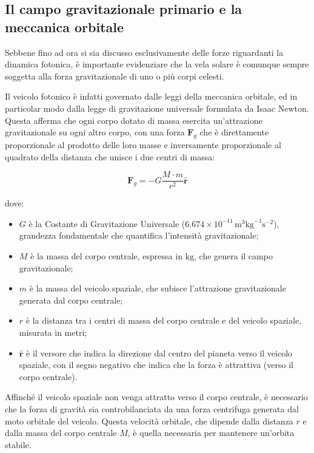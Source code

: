 
\subsection{Il campo gravitazionale primario e la meccanica orbitale}
Sebbene fino ad ora si sia discusso esclusivamente delle forze riguardanti la dinamica fotonica, è importante evidenziare che la vela solare è comunque sempre soggetta alla forza gravitazionale di uno o più corpi celesti.

Il veicolo fotonico è infatti governato dalle leggi della meccanica orbitale, ed in particolar modo dalla legge di gravitazione universale formulata da Isaac Newton.
Questa afferma che ogni corpo dotato di massa esercita un'attrazione gravitazionale su ogni altro corpo, con una forza $\mathbf{F}_g$ che è direttamente proporzionale al prodotto delle loro masse e inversamente proporzionale al quadrato della distanza che unisce i due centri di massa:

\begin{equation}
    \mathbf{F}_g = - G \frac{M \cdot m}{r^2} \mathbf{\hat{r}}
\end{equation}

dove:
\begin{itemize}
    \item $G$ è la Costante di Gravitazione Universale ($6.674 \times 10^{-11} \, \text{m}^3 \text{kg}^{-1} \text{s}^{-2}$), grandezza fondamentale che quantifica l'intensità gravitazionale;
    \item $M$ è la massa del corpo centrale, espressa in $\text{kg}$, che genera il campo gravitazionale;
    \item $m$ è la massa del veicolo spaziale, che subisce l'attrazione gravitazionale generata dal corpo centrale;
    \item $r$ è la distanza tra i centri di massa del corpo centrale e del veicolo spaziale, misurata in metri;
    \item $\mathbf{\hat{r}}$ è il versore che indica la direzione dal centro del pianeta verso il veicolo spaziale, con il segno negativo che indica che la forza è attrattiva (verso il corpo centrale).
\end{itemize}


Affinché il veicolo spaziale non venga attratto verso il corpo centrale, è necessario che la forza di gravità sia controbilanciata da una forza centrifuga generata dal moto orbitale del veicolo.
Questa velocità orbitale, che dipende dalla distanza $r$ e dalla massa del corpo centrale $M$, è quella necessaria per mantenere un'orbita stabile.

